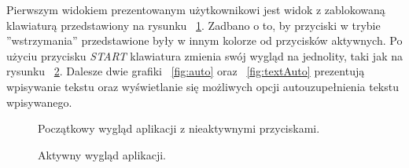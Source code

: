 \documentclass[twoside,a4paper]{book}
\begin{document}
Pierwszym widokiem prezentowanym użytkownikowi jest widok z zablokowaną klawiaturą przedstawiony na rysunku ~\ref{fig:inactive}.  Zadbano o to, by przyciski w trybie ''wstrzymania'' przedstawione były w innym kolorze od przycisków aktywnych. Po użyciu przycisku \textit{START} klawiatura zmienia swój wygląd na jednolity, taki jak na rysunku ~\ref{fig:active}.
Dalesze dwie grafiki ~\ref{fig:auto} oraz ~\ref{fig:textAuto} prezentują wpisywanie tekstu oraz wyświetlanie się możliwych opcji autouzupełnienia tekstu wpisywanego. 
\begin{figure}[h]
		\centering
		\caption{Początkowy wygląd aplikacji z nieaktywnymi przyciskami. }
		\label{fig:inactive}
\end{figure}
\begin{figure}
		\centering
		\caption{Aktywny wygląd aplikacji. }
		\label{fig:active}
\end{figure}
\end{document}
